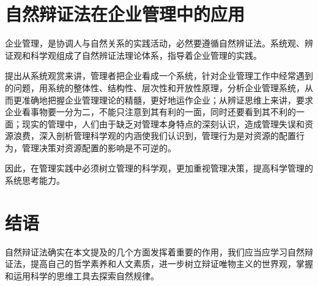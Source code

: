 \documentclass[UTF8,a4paper]{ctexart}
\begin{document}
\section{自然辩证法在企业管理中的应用}
企业管理，是协调人与自然关系的实践活动，必然要遵循自然辨证法。系统观、辨证观和科学观组成了自然辨证法理论体系，指导着企业管理的实践。
\par
\cite{RN12}提出从系统观赏来讲，管理者把企业看成一个系统，针对企业管理工作中经常遇到的问题，用系统的整体性、结构性、层次性和开放性原理，分析企业管理系统，从而更准确地把握企业管理理论的精髓，更好地运作企业；从辨证思维上来讲，要求企业看事物要一分为二，不能只注意到其有利的一面，同时还要看到其不利的一面；现实的管理中，人们由于缺乏对管理本身特点的深刻认识，造成管理失误和资源浪费，深入剖析管理科学观的内涵使我们认识到，管理行为是对资源的配置行为，管理决策对资源配置的影响是不可逆的。
\par
因此，在管理实践中必须树立管理的科学观，更加重视管理决策，提高科学管理的系统思考能力。
\section{结语}
自然辩证法确实在本文提及的几个方面发挥着重要的作用，我们应当应学习自然辩证法，提高自己的哲学素养和人文素质，进一步树立辩证唯物主义的世界观，掌握和运用科学的思维工具去探索自然规律。
\renewcommand{\refname}{参考文献}


\clearpage
\end{document}
